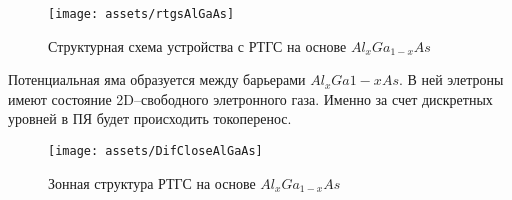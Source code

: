 \begin{figure}[h]
  \centering
  \texttt{[image: assets/rtgsAlGaAs]}
  \caption{Структурная схема устройства с РТГС на основе $Al_{x}Ga_{1-x}As$}
  \label{img:rtgsAlGaAs}
\end{figure}

Потенциальная яма образуется между барьерами $Al_{x}Ga{1-x}As$. В ней элетроны имеют состояние 2D--свободного элетронного газа. Именно за счет дискретных уровней в ПЯ будет происходить токоперенос.
\begin{figure}[h]
  \centering
  \texttt{[image: assets/DifCloseAlGaAs]}
  \caption{Зонная структура РТГС на основе $Al_{x}Ga_{1-x}As$}
  \label{img:DifCloseAlGaAs}
\end{figure}








